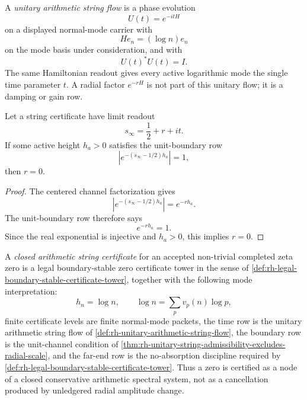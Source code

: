 \begin{definition}
\label{def:rh-unitary-arithmetic-string-flow}
A \emph{unitary arithmetic string flow} is a phase evolution
$$
U(t)=e^{-itH}
$$
on a displayed normal-mode carrier with
$$
H e_n=(\log n)e_n
$$
on the mode basis under consideration, and with
$$
U(t)^*U(t)=I.
$$
The same Hamiltonian readout gives every active logarithmic mode the
single time parameter $t$. A radial factor $e^{-rH}$ is not part of this
unitary flow; it is a damping or gain row.
\end{definition}

\begin{theorem}
\label{thm:rh-unitary-string-admissibility-excludes-radial-scale}
Let a string certificate have limit readout
$$
s_{\infty}=\frac12+r+it.
$$
If some active height $h_a>0$ satisfies the unit-boundary row
$$
|e^{-(s_{\infty}-1/2)h_a}|=1,
$$
then $r=0$.
\end{theorem}

\begin{proof}
The centered channel factorization gives
$$
|e^{-(s_{\infty}-1/2)h_a}|=e^{-r h_a}.
$$
The unit-boundary row therefore says
$$
e^{-r h_a}=1.
$$
Since the real exponential is injective and $h_a>0$, this implies
$r=0$.
\end{proof}

\begin{definition}
\label{def:rh-closed-arithmetic-string-certificate}
A \emph{closed arithmetic string certificate} for an accepted
non-trivial completed zeta zero is a legal boundary-stable zero
certificate tower in the sense of
\autoref{def:rh-legal-boundary-stable-certificate-tower}, together with
the following mode interpretation:
$$
h_n=\log n,
\qquad
\log n=\sum_p v_p(n)\log p,
$$
finite certificate levels are finite normal-mode packets, the time row
is the unitary arithmetic string flow of
\autoref{def:rh-unitary-arithmetic-string-flow}, the boundary row is the
unit-channel condition of
\autoref{thm:rh-unitary-string-admissibility-excludes-radial-scale}, and
the far-end row is the no-absorption discipline required by
\autoref{def:rh-legal-boundary-stable-certificate-tower}. Thus a zero is
certified as a node of a closed conservative arithmetic spectral system,
not as a cancellation produced by unledgered radial amplitude change.
\end{definition}


